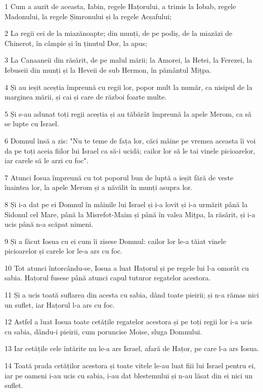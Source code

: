 \par 1 Cum a auzit de aceasta, Iabin, regele Hațorului, a trimis la Iobab, regele Madonului, la regele Șimronului și la regele Acșafului;
\par 2 La regii cei de la miazănoapte; din munți, de pe podiș, de la miazăzi de Chinerot, în câmpie și în ținutul Dor, la apus;
\par 3 La Canaaneii din răsărit, de pe malul mării; la Amorei, la Hetei, la Ferezei, la Iebuseii din munți și la Heveii de sub Hermon, în pământul Mițpa.
\par 4 Și au ieșit aceștia împreună cu regii lor, popor mult la număr, ca nisipul de la marginea mării, și cai și care de război foarte multe.
\par 5 Și s-au adunat toți regii aceștia și au tăbărât împreună la apele Merom, ca să se lupte cu Israel.
\par 6 Domnul însă a zis: "Nu te teme de fața lor, căci mâine pe vremea aceasta îi voi da pe toți aceia fiilor lui Israel ca să-i ucidă; cailor lor să le tai vinele picioarelor, iar carele să le arzi cu foc".
\par 7 Atunci Iosua împreună cu tot poporul bun de luptă a ieșit fără de veste înaintea lor, la apele Merom și a năvălit în munți asupra lor.
\par 8 Și i-a dat pe ei Domnul în mâinile lui Israel și i-a lovit și i-a urmărit până la Sidonul cel Mare, până la Misrefot-Maim și până în valea Mițpa, la răsărit, și i-a ucis până n-a scăpat nimeni.
\par 9 Și a făcut Iosua cu ei cum îi zisese Domnul: cailor lor le-a tăiat vinele picioarelor și carele lor le-a ars cu foc.
\par 10 Tot atunci întorcându-se, Iosua a luat Hațorul și pe regele lui l-a omorât cu sabia. Hațorul fusese până atunci capul tuturor regatelor acestora.
\par 11 Și a ucis toată suflarea din acesta cu sabia, dând toate pieirii; și n-a rămas nici un suflet, iar Hațorul l-a ars cu foc.
\par 12 Astfel a luat Iosua toate cetățile regatelor acestora și pe toți regii lor i-a ucis cu sabia, dându-i pieirii, cum poruncise Moise, sluga Domnului.
\par 13 Iar cetățile cele întărite nu le-a ars Israel, afară de Hațor, pe care l-a ars Iosua.
\par 14 Toată prada cetăților acestora și toate vitele le-au luat fiii lui Israel pentru ei, iar pe oameni i-au ucis cu sabia, i-au dat blestemului și n-au lăsat din ei nici un suflet.
